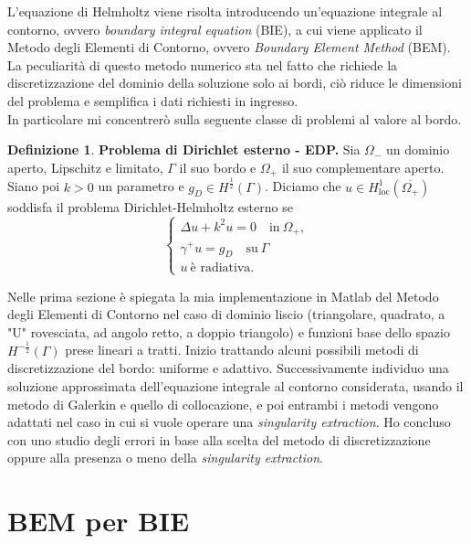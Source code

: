 \documentclass[a4paper]{article}
\theoremstyle{definition}
\newtheorem{definizione}{Definizione}
\theoremstyle{plain}
\theoremstyle{remark}
\begin{document}
{	L'equazione di Helmholtz viene risolta introducendo un'equazione integrale al contorno, ovvero \textit{boundary integral equation} (BIE), a cui viene applicato il Metodo degli Elementi di Contorno, ovvero \textit{Boundary Element Method} (BEM). La peculiarità di questo metodo numerico sta nel fatto che richiede la discretizzazione del dominio della soluzione solo ai bordi, ciò riduce le dimensioni del problema e semplifica i dati richiesti in ingresso. \\
	In particolare mi concentrerò sulla seguente classe di problemi al valore al bordo.
	\begin{definizione}
		\textbf{Problema di Dirichlet esterno - EDP.} Sia $\Omega_{-}$ un dominio aperto, Lipschitz e limitato, $\Gamma$ il suo bordo e $\Omega_+$ il suo complementare aperto. Siano poi $k>0$ un parametro e $g_D \in H^{\frac{1}{2}}(\Gamma)$. Diciamo che $u \in H^1_{\text{loc}}(\overline{\Omega_{+}})$ soddisfa il problema Dirichlet-Helmholtz esterno se
		\begin{equation}
			\begin{cases}
				\Delta u + k^2 u = 0 \quad \text{in} \ \Omega_+,\\
				\gamma^+ u = g_D \quad \text{su} \ \Gamma\\
				u \ \text{è radiativa}.
			\end{cases}
		\end{equation}
	\end{definizione}
	Nelle prima sezione è spiegata la mia implementazione in Matlab del Metodo degli Elementi di Contorno nel caso di dominio liscio (triangolare, quadrato, a "U" rovesciata, ad angolo retto, a doppio triangolo) e funzioni base dello spazio $H^{-\frac{1}{2}}(\Gamma)$ prese lineari a tratti. Inizio trattando alcuni possibili metodi di discretizzazione del bordo: uniforme e adattivo. Successivamente individuo una soluzione approssimata dell'equazione integrale al contorno considerata, usando il metodo di Galerkin e quello di collocazione, e poi entrambi i metodi vengono adattati nel caso in cui si vuole operare una \textit{singularity extraction}. Ho concluso con uno studio degli errori in base alla scelta del metodo di discretizzazione oppure alla presenza o meno della \textit{singularity extraction}.
	}

	\tableofcontents
	
%	
	
%	
	
	\section{BEM per BIE}
	
	
%	
%	
%	
	
\end{document}
